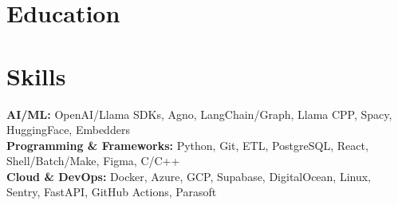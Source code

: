 \documentclass{../templates/simplecv}
\begin{document}
\section{Education}
\resumeItemListStart
{}
\resumeItemListEnd

\section{Skills}
\resumeSubHeadingListStart
\normalsize{\item{
\textbf{AI/ML: }{OpenAI/Llama SDKs, Agno, LangChain/Graph, Llama CPP, Spacy, HuggingFace, Embedders} \\ \vspace{1pt}
\textbf{Programming \& Frameworks: }{Python, Git, ETL, PostgreSQL, React, Shell/Batch/Make, Figma, C/C++} \\ \vspace{1pt}
\textbf{Cloud \& DevOps: }{Docker, Azure, GCP, Supabase, DigitalOcean, Linux, Sentry, FastAPI, GitHub Actions, Parasoft} \\ \vspace{1pt}
}}
\resumeSubHeadingListEnd
\end{document}
